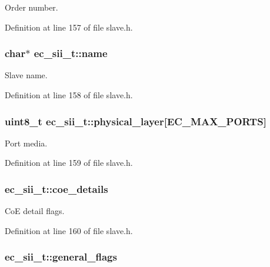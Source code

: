 Order number. 



Definition at line 157 of file slave.\-h.

\subsubsection[{name}]{\setlength{\rightskip}{0pt plus 5cm}char$\ast$ ec\-\_\-sii\-\_\-t\-::name}\label{structec__sii__t_ae4a7f50f715570d1cbfce538ab7828d9}


Slave name. 



Definition at line 158 of file slave.\-h.

\subsubsection[{physical\-\_\-layer}]{\setlength{\rightskip}{0pt plus 5cm}uint8\-\_\-t ec\-\_\-sii\-\_\-t\-::physical\-\_\-layer[{\bf E\-C\-\_\-\-M\-A\-X\-\_\-\-P\-O\-R\-T\-S}]}\label{structec__sii__t_afa995764cc295a2de209b27f2ac07f85}


Port media. 



Definition at line 159 of file slave.\-h.

\subsubsection[{coe\-\_\-details}]{ ec\-\_\-sii\-\_\-t\-::coe\-\_\-details}\label{structec__sii__t_a7896df4d79afdb971b9817d41fbb847e}


Co\-E detail flags. 



Definition at line 160 of file slave.\-h.

\subsubsection[{general\-\_\-flags}]{ ec\-\_\-sii\-\_\-t\-::general\-\_\-flags}\label{structec__sii__t_a7ff70e83d0e1870bc344218f53f85aaf}


